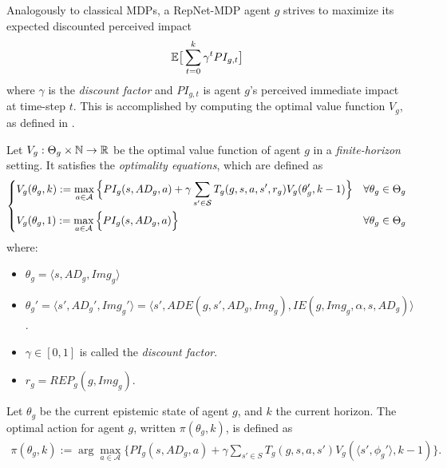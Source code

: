 Analogously to classical MDPs, a RepNet-MDP agent $g$ strives to maximize its expected discounted perceived impact
\begin{align}
    \mathbb{E} \big[ \sum_{t = 0}^{k} \gamma^t PI_{g,t}\big]
\end{align}
where $\gamma$ is the \textit{discount factor} and $PI_{g,t}$ is agent $g$'s perceived immediate impact at time-step $t$. This is accomplished by computing the optimal value function $V_g$, as defined in .
\begin{definition} 
\label{def:opti}
Let $V_g : \Theta_g \times \mathbb{N} \rightarrow \mathbb{R}$ be the optimal value function of agent $g$ in a \textit{finite-horizon} setting. It satisfies the \textit{optimality equations}, which are defined as 
    \begin{align*}
        \begin{dcases}
            V_g(\theta_g, k) := \max_{a \in \mathcal{A}} \Big\{ PI_g(s,AD_g,a) + \gamma \sum_{s' \in \mathcal{S}} T_g(g,s,a,s',r_g) V_g( \theta_g', k-1) \Big\}  &\forall \theta_g \in \Theta_g
            \\
            V_g(\theta_g, 1) := \max_{a \in \mathcal{A}} \Big\{ PI_g(s,AD_g,a) \Big\} &\forall \theta_g \in \Theta_g
        \end{dcases}
    \end{align*}
    where:
    \begin{itemize}
    \item $\theta_g = \big \langle s, AD_g, Img_g \big \rangle$
        \item $\theta_g' = \big \langle s', AD_g', Img_g' \big \rangle = \big \langle s', ADE(g, s', AD_g, Img_g), IE(g, Img_g, \alpha, s, AD_g) \big \rangle$.
        \item $\gamma \in [0,1]$ is called the \textit{discount factor}.
        \item $r_g = REP_g(g, Img_g)$.
    \end{itemize}
\end{definition}
\begin{definition}
Let $\theta_g$ be the current epistemic state of agent $g$, and $k$ the current horizon. The optimal action for agent $g$, written $\pi(\theta_g, k)$, is defined as
\begin{align*}
    \pi(\theta_g, k) := \arg \max_{a \in \mathcal{A}} \Big\{ PI_g(s,AD_g,a) + \gamma \sum_{s' \in S} T_g(g,s,a,s') V_g(\big \langle s', \phi_g' \big \rangle, k-1) \Big\}.
\end{align*}
\end{definition}

